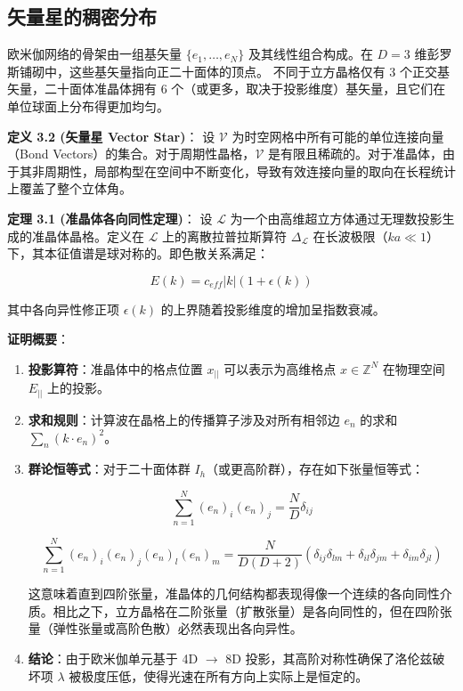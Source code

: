 \subsection{矢量星的稠密分布}

欧米伽网络的骨架由一组基矢量 $\{e_1, \dots, e_N\}$ 及其线性组合构成。在 $D=3$ 维彭罗斯铺砌中，这些基矢量指向正二十面体的顶点。
不同于立方晶格仅有 3 个正交基矢量，二十面体准晶体拥有 6 个（或更多，取决于投影维度）基矢量，且它们在单位球面上分布得更加均匀。

\textbf{定义 3.2 (矢量星 Vector Star)}：
设 $\mathcal{V}$ 为时空网格中所有可能的单位连接向量（Bond Vectors）的集合。对于周期性晶格，$\mathcal{V}$ 是有限且稀疏的。对于准晶体，由于其非周期性，局部构型在空间中不断变化，导致有效连接向量的取向在长程统计上覆盖了整个立体角。

\textbf{定理 3.1 (准晶体各向同性定理)}：
设 $\mathcal{L}$ 为一个由高维超立方体通过无理数投影生成的准晶体晶格。定义在 $\mathcal{L}$ 上的离散拉普拉斯算符 $\Delta_{\mathcal{L}}$ 在长波极限（$k a \ll 1$）下，其本征值谱是球对称的。即色散关系满足：

\[E(k) = c_{eff} |k| \left( 1 + \epsilon(k) \right)\]

其中各向异性修正项 $\epsilon(k)$ 的上界随着投影维度的增加呈指数衰减。

\textbf{证明概要}：

\begin{enumerate}
\item \textbf{投影算符}：准晶体中的格点位置 $x_{||}$ 可以表示为高维格点 $x \in \mathbb{Z}^N$ 在物理空间 $E_{||}$ 上的投影。
\item \textbf{求和规则}：计算波在晶格上的传播算子涉及对所有相邻边 $e_n$ 的求和 $\sum_n (k \cdot e_n)^2$。
\item \textbf{群论恒等式}：对于二十面体群 $I_h$（或更高阶群），存在如下张量恒等式：

\[\sum_{n=1}^N (e_n)_i (e_n)_j = \frac{N}{D} \delta_{ij}\]

\[\sum_{n=1}^N (e_n)_i (e_n)_j (e_n)_l (e_n)_m = \frac{N}{D(D+2)} (\delta_{ij}\delta_{lm} + \delta_{il}\delta_{jm} + \delta_{im}\delta_{jl})\]

这意味着直到四阶张量，准晶体的几何结构都表现得像一个连续的各向同性介质。相比之下，立方晶格在二阶张量（扩散张量）是各向同性的，但在四阶张量（弹性张量或高阶色散）必然表现出各向异性。
\item \textbf{结论}：由于欧米伽单元基于 4D $\to$ 8D 投影，其高阶对称性确保了洛伦兹破坏项 $\lambda$ 被极度压低，使得光速在所有方向上实际上是恒定的。
\end{enumerate}

